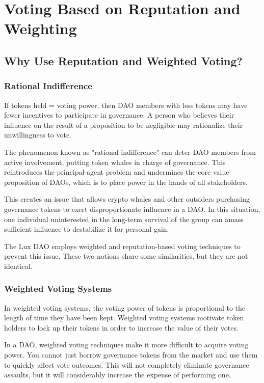 \documentclass[11pt]{article}
\begin{document}
\section{Voting Based on Reputation and Weighting}

\subsection{Why Use Reputation and Weighted Voting?}

\subsubsection{Rational Indifference}

If tokens held = voting power, then DAO members with less tokens may have fewer incentives to participate in governance. A person who believes their influence on the result of a proposition to be negligible may rationalize their unwillingness to vote.


The phenomenon known as "rational indifference" can deter DAO members from active involvement, putting token whales in charge of governance. This reintroduces the principal-agent problem and undermines the core value proposition of DAOs, which is to place power in the hands of all stakeholders.


This creates an issue that allows crypto whales and other outsiders purchasing governance tokens to exert disproportionate influence in a DAO. In this situation, one individual uninterested in the long-term survival of the group can amass sufficient influence to destabilize it for personal gain.


The Lux DAO employs weighted and reputation-based voting techniques to prevent this issue. These two notions share some similarities, but they are not identical.


\subsubsection{Weighted Voting Systems}

In weighted voting systems, the voting power of tokens is proportional to the length of time they have been kept. Weighted voting systems motivate token holders to lock up their tokens in order to increase the value of their votes.


In a DAO, weighted voting techniques make it more difficult to acquire voting power. You cannot just borrow governance tokens from the market and use them to quickly affect vote outcomes. This will not completely eliminate governance assaults, but it will considerably increase the expense of performing one.
\end{document}
